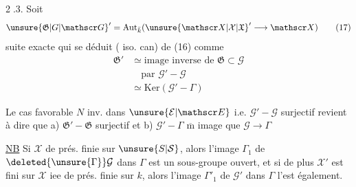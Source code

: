 
\textcircled{2.3}. Soit
\[
\unsure{\mathfrak G|G|\mathscr G}'=\mathrm{Aut}_{\bar k}(\unsure{\mathscr X|\mathcal X|\mathfrak X}'\longrightarrow\mathscr X)\tag*{(17)}
\]
  suite exacte
qui se déduit ( iso. can) de (16) comme
\[
\begin{aligned}
\mathfrak G'&\simeq\text{image inverse de }\mathfrak G\subset\mathcal G\\
&\hspace{1em}\text{par }\mathcal G'\mathbin{-}\mathcal G\\
&\simeq\mathrm{Ker}(\mathcal G'\mathbin{-}\Gamma)
\end{aligned}\tag*{(19)}
\]

Le cas favorable $N$ inv. dans $\unsure{\mathcal E|\mathscr E}$ i.e. $\mathcal G'\mathbin{-}\mathcal G$ surjectif revient à dire que a) $\mathfrak G'\mathbin{-}\mathfrak G$ surjectif et b) $\mathcal G'\mathbin{-}\Gamma$  $\overline{\mathrm{m}}$ image que $\mathcal G\to\Gamma$


\uline{NB} Si $\mathscr X$ de prés. finie sur $\unsure{S|\mathcal S}$, alors l’image $\Gamma_1$ de $\deleted{\unsure{\Gamma}}\mathcal G$ dans $\Gamma$ est un sous-groupe ouvert, et si de plus $\mathscr X'$ est fini sur $\mathscr X$ iee de prés. finie sur $k$, alors l’image $\Gamma'_1$  de $\mathcal G'$ dans $\Gamma$ l’est également.

